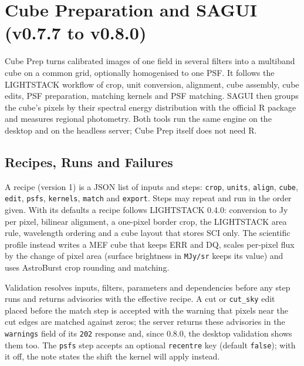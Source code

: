 \documentclass[11pt,a4paper]{article}
\newcommand{\code}[1]{\texttt{\small #1}}
\begin{document}
    \section{Cube Preparation and SAGUI (v0.7.7 to v0.8.0)}
    \label{sec:cubeprep}

    Cube Prep turns calibrated images of one field in several filters into a multiband cube on a common grid, optionally homogenised to one PSF. It follows the LIGHTSTACK workflow of crop, unit conversion, alignment, cube assembly, cube edits, PSF preparation, matching kernels and PSF matching. SAGUI then groups the cube's pixels by their spectral energy distribution with the official R package and measures regional photometry. Both tools run the same engine on the desktop and on the headless server; Cube Prep itself does not need R.

    \subsection{Recipes, Runs and Failures}
    \label{sec:server_cubeprep}

    A recipe (version 1) is a JSON list of inputs and steps: \code{crop}, \code{units}, \code{align}, \code{cube}, \code{edit}, \code{psfs}, \code{kernels}, \code{match} and \code{export}. Steps may repeat and run in the order given. With its defaults a recipe follows LIGHTSTACK 0.4.0: conversion to Jy per pixel, bilinear alignment, a one-pixel border crop, the LIGHTSTACK area rule, wavelength ordering and a cube layout that stores SCI only. The scientific profile instead writes a MEF cube that keeps ERR and DQ, scales per-pixel flux by the change of pixel area (surface brightness in \code{MJy/sr} keeps its value) and uses AstroBurst crop rounding and matching.

    Validation resolves inputs, filters, parameters and dependencies before any step runs and returns advisories with the effective recipe. A cut or \code{cut\_sky} edit placed before the match step is accepted with the warning that pixels near the cut edges are matched against zeros; the server returns these advisories in the \code{warnings} field of its \code{202} response and, since 0.8.0, the desktop validation shows them too. The \code{psfs} step accepts an optional \code{recentre} key (default \code{false}); with it off, the note states the shift the kernel will apply instead.
\end{document}
